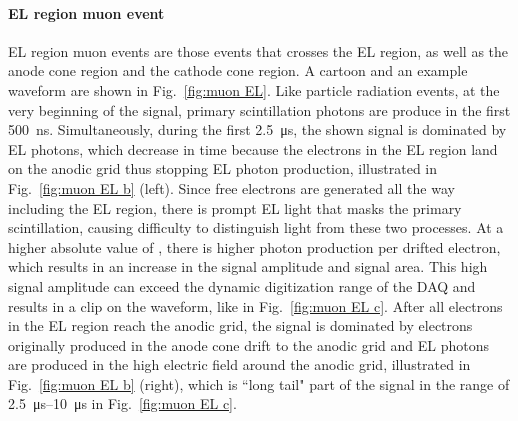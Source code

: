 \paragraph{EL region muon event}
\label{sec:events muon EL region}
EL region muon events are those events that crosses the EL region, as well as the anode cone region and the cathode cone region. A cartoon and an example waveform are shown in Fig.~\ref{fig:muon EL}. Like particle radiation events, at the very beginning of the signal, primary scintillation photons are produce in the first \SI{500}{\ns}. Simultaneously, during the first \SI{2.5}{\us}, the shown signal is dominated by EL photons, which decrease in time because the electrons in the EL region land on the anodic grid thus stopping EL photon production, illustrated in Fig.~\ref{fig:muon EL b} (left). 
Since free electrons are generated all the way including the EL region, there is prompt EL light that masks the primary scintillation, causing difficulty to distinguish light from these two processes.
At a higher absolute value of \opdv , there is higher photon production per drifted electron, which results in an increase in the signal amplitude and signal area. This high signal amplitude can exceed the dynamic digitization range of the DAQ and results in a clip on the waveform, like in Fig.~\ref{fig:muon EL c}. After all electrons in the EL region reach the anodic grid, the signal is dominated by electrons originally produced in the anode cone drift to the anodic grid and EL photons are produced in the high electric field around the anodic grid, illustrated in Fig.~\ref{fig:muon EL b} (right), which is ``long tail" part of the signal in the range of \SIrange{2.5}{10}{\us} in Fig.~\ref{fig:muon EL c}.

